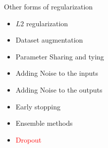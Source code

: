 \begin{frame}
\end{frame}

\begin{frame}
	\vspace{4em}
	\begin{overlayarea}{\textwidth}{\textheight}
		\begin{block}{Other forms of regularization}
			\begin{itemize}
				\item $L2$ regularization
				\item Dataset augmentation
				\item Parameter Sharing and tying
				\item Adding Noise to the inputs
				\item Adding Noise to the outputs 
				\item Early stopping
				\item Ensemble methods
				\item \textcolor<2->{red}{Dropout}
			\end{itemize}
		\end{block}
	\end{overlayarea}
\end{frame}


